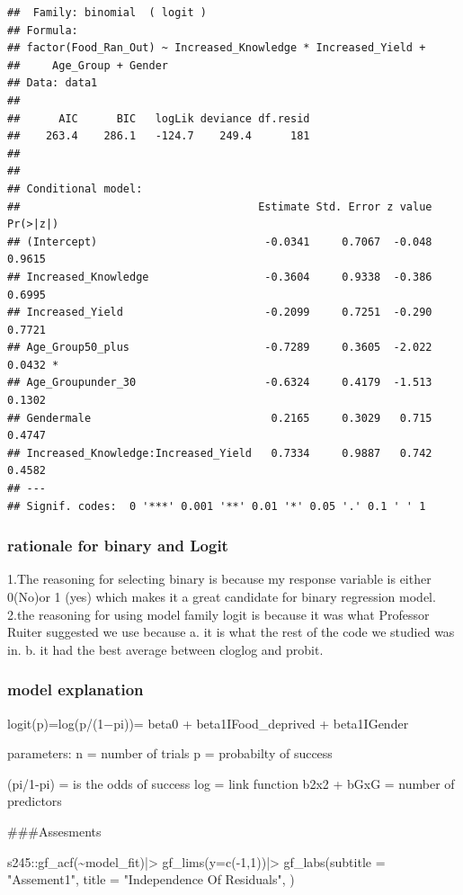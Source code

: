 \documentclass[
]{article}
\newenvironment{Shaded}{\begin{snugshade}}{\end{snugshade}}
\newcommand{\AttributeTok}[1]{\textcolor[rgb]{0.77,0.63,0.00}{#1}}
\newcommand{\DecValTok}[1]{\textcolor[rgb]{0.00,0.00,0.81}{#1}}
\newcommand{\FunctionTok}[1]{\textcolor[rgb]{0.00,0.00,0.00}{#1}}
\newcommand{\NormalTok}[1]{#1}
\newcommand{\SpecialCharTok}[1]{\textcolor[rgb]{0.00,0.00,0.00}{#1}}
\newcommand{\StringTok}[1]{\textcolor[rgb]{0.31,0.60,0.02}{#1}}
\begin{document}
\begin{verbatim}
##  Family: binomial  ( logit )
## Formula:          
## factor(Food_Ran_Out) ~ Increased_Knowledge * Increased_Yield +  
##     Age_Group + Gender
## Data: data1
## 
##      AIC      BIC   logLik deviance df.resid 
##    263.4    286.1   -124.7    249.4      181 
## 
## 
## Conditional model:
##                                     Estimate Std. Error z value Pr(>|z|)  
## (Intercept)                          -0.0341     0.7067  -0.048   0.9615  
## Increased_Knowledge                  -0.3604     0.9338  -0.386   0.6995  
## Increased_Yield                      -0.2099     0.7251  -0.290   0.7721  
## Age_Group50_plus                     -0.7289     0.3605  -2.022   0.0432 *
## Age_Groupunder_30                    -0.6324     0.4179  -1.513   0.1302  
## Gendermale                            0.2165     0.3029   0.715   0.4747  
## Increased_Knowledge:Increased_Yield   0.7334     0.9887   0.742   0.4582  
## ---
## Signif. codes:  0 '***' 0.001 '**' 0.01 '*' 0.05 '.' 0.1 ' ' 1
\end{verbatim}

\hypertarget{rationale-for-binary-and-logit}{%
\subsubsection{rationale for binary and
Logit}\label{rationale-for-binary-and-logit}}

1.The reasoning for selecting binary is because my response variable is
either 0(No)or 1 (yes) which makes it a great candidate for binary
regression model. 2.the reasoning for using model family logit is
because it was what Professor Ruiter suggested we use because a. it is
what the rest of the code we studied was in. b. it had the best average
between cloglog and probit.

\hypertarget{model-explanation}{%
\subsubsection{model explanation}\label{model-explanation}}

logit(p)=log(p/(1−pi))= beta0 + beta1IFood\_deprived + beta1IGender

parameters: n = number of trials p = probabilty of success

(pi/1-pi) = is the odds of success log = link function b2x2 + bGxG =
number of predictors

\#\#\#Assesments

\begin{Shaded}
\begin{Highlighting}[]
\NormalTok{s245}\SpecialCharTok{::}\FunctionTok{gf\_acf}\NormalTok{(}\SpecialCharTok{\textasciitilde{}}\NormalTok{model\_fit)}\SpecialCharTok{|\textgreater{}}
\FunctionTok{gf\_lims}\NormalTok{(}\AttributeTok{y=}\FunctionTok{c}\NormalTok{(}\SpecialCharTok{{-}}\DecValTok{1}\NormalTok{,}\DecValTok{1}\NormalTok{))}\SpecialCharTok{|\textgreater{}}
   \FunctionTok{gf\_labs}\NormalTok{(}\AttributeTok{subtitle =} \StringTok{"Assement1"}\NormalTok{, }\AttributeTok{title =} \StringTok{"Independence Of Residuals"}\NormalTok{, )}
\end{Highlighting}
\end{Shaded}
\end{document}
